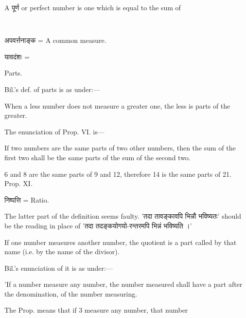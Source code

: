 \documentclass[11pt, openany]{book}
\begin{document}
{\en A} पूर्ण {\en or perfect number is one which is equal to the sum of}


\newpage

\\


अपवर्त्तनाङ्क = {\en A common measure.}\\


यावदंशः = {\en Parts.

Bil.'s def. of parts is as under:---

When a less number does not measure a greater one, the less is parts of the greater.

The enunciation of Prop. VI. is---

If two numbers are the same parts of two other numbers, then the sum of the first two shall be the same parts of the sum of the second two.

6 and 8 are the same parts of 9 and 12, therefore 14 is the same parts of 21.\\

\noindent Prop. XI.}

निष्पत्ति = {\en Ratio.}\\


{\en The latter part of the definition seems faulty.} 'तदा तावङ्कावपि भिन्नौ भविष्यतः' {\en should be the reading in place of} 'तदा तदङ्कयोगयो-रन्तरमपि भिन्नं भविष्यति ।'\\


{\en If one number measures another number, the quotient is a part called by that name (i.e. by the name of the divisor).

Bil.'s enunciation of it is as under:---

'If a number measure any number, the number measured shall have a part after the denomination, of the number measuring. 

The Prop. means that if 3 measure any number, that number}
\end{document}
